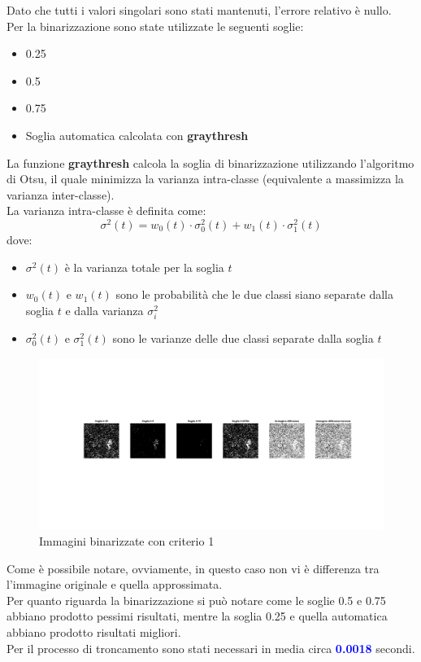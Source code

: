\noindent Dato che tutti i valori singolari sono stati mantenuti, l'errore relativo è nullo.\\
Per la binarizzazione sono state utilizzate le seguenti soglie:
\begin{itemize}
    \item 0.25
    \item 0.5
    \item 0.75
    \item Soglia automatica calcolata con \textbf{graythresh}
\end{itemize}
\noindent La funzione \textbf{graythresh} calcola la soglia di binarizzazione utilizzando l'algoritmo di Otsu, il quale minimizza la varianza intra-classe (equivalente a massimizza la varianza inter-classe).\\La varianza intra-classe è definita come:
\begin{equation}
    \sigma^2(t) = w_0(t) \cdot \sigma_0^2(t) + w_1(t) \cdot \sigma_1^2(t)
\end{equation}
dove:
\begin{itemize}
    \item $\sigma^2(t)$ è la varianza totale per la soglia $t$
    \item $w_0(t)$ e $w_1(t)$ sono le probabilità che le due classi siano separate dalla soglia $t$ e dalla varianza $\sigma_i^2$
    \item $\sigma_0^2(t)$ e $\sigma_1^2(t)$ sono le varianze delle due classi separate dalla soglia $t$
\end{itemize}

\begin{figure}[H]
    \centering
     \includegraphics[width=\textwidth]{images/Criterio1.jpg}
    \caption{Immagini binarizzate con criterio 1}
\end{figure}

\noindent Come è possibile notare, ovviamente, in questo caso non vi è differenza tra l'immagine originale e quella approssimata.\\
Per quanto riguarda la binarizzazione si può notare come le soglie 0.5 e 0.75 abbiano prodotto pessimi risultati, mentre la soglia 0.25 e quella automatica abbiano prodotto risultati migliori.\\
\noindent Per il processo di troncamento sono stati necessari in media circa \textcolor{blue}{\textbf{0.0018}} secondi.\\




